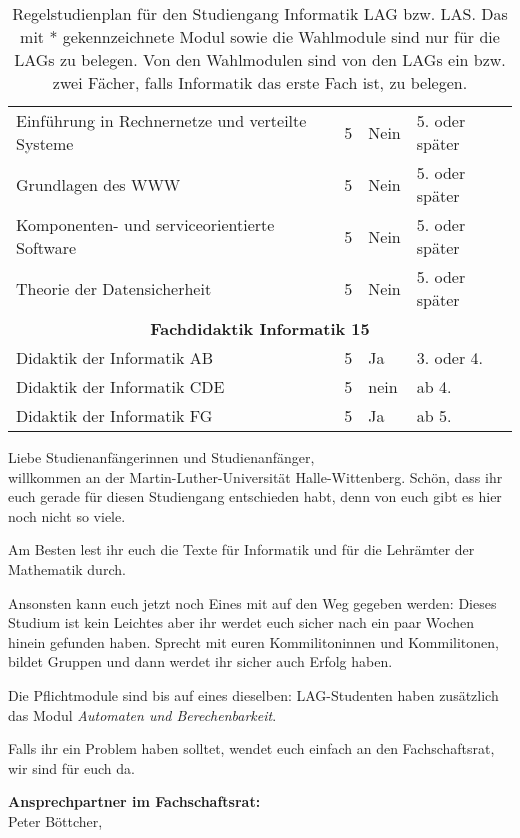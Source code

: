 \begin{table}[tbp]
\begin{small}
\begin{tabularx}{\textwidth}{|b{}|X|X|X|}
			Einführung in Rechnernetze und verteilte Systeme & 5 & Nein & 5. oder später \\
			Grundlagen des WWW                               & 5 & Nein & 5. oder später \\
			Komponenten- und serviceorientierte Software     & 5 & Nein & 5. oder später \\
			Theorie der Datensicherheit                      & 5 & Nein & 5. oder später \\
			\hline
			\multicolumn{4}{|c|}{\textbf{Fachdidaktik Informatik 15}}\\\hline
			Didaktik der Informatik AB  & 5 & Ja   & 3. oder 4. \\
			Didaktik der Informatik CDE & 5 & nein & ab 4. \\
			Didaktik der Informatik FG  & 5 & Ja   & ab 5. \\
			\hline
		\end{tabularx}
	\end{small}
	\caption{\label{plan-laI}Regelstudienplan für den Studiengang Informatik LAG bzw. LAS. Das mit * gekennzeichnete Modul sowie die Wahlmodule sind nur für die LAGs zu belegen. Von den Wahlmodulen sind von den LAGs ein bzw. zwei Fächer, falls Informatik das erste Fach ist, zu belegen.}
\end{table}

Liebe Studienanfängerinnen und Studienanfänger,\\
willkommen an der Martin-Luther-Universität Halle-Wittenberg.
Schön, dass ihr euch gerade für diesen Studiengang entschieden habt, denn von euch gibt es hier noch nicht so viele.

Am Besten lest ihr euch die Texte für Informatik und für die Lehrämter der Mathematik durch.

Ansonsten kann euch jetzt noch Eines mit auf den Weg gegeben werden:
Dieses Studium ist kein Leichtes aber ihr werdet euch sicher nach ein paar Wochen hinein gefunden haben.
Sprecht mit euren Kommilitoninnen und Kommilitonen, bildet Gruppen und dann werdet ihr sicher auch Erfolg haben.

Die Pflichtmodule sind bis auf eines dieselben: LAG-Studenten haben zusätzlich das Modul \textit{Automaten und Berechenbarkeit}.

Falls ihr ein Problem haben solltet, wendet euch einfach an den Fachschaftsrat, wir sind für euch da.

\textbf{Ansprechpartner im Fachschaftsrat:}\\
Peter Böttcher, \\

